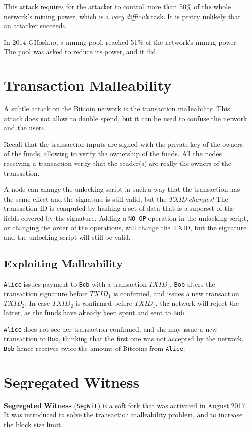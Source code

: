 This attack requires for the attacker to control more than 50\% of the whole network's mining power, which is a \textit{very difficult} task. It is pretty unlikely that an attacker succeeds.

In 2014 GHash.io, a mining pool, reached 51\% of the network's mining power. The pool was asked to reduce its power, and it did.

\section{Transaction Malleability}
A subtle attack on the Bitcoin network is the transaction malleability. This attack does not allow to double spend, but it can be used to confuse the network and the users.

Recall that the transaction inputs are signed with the private key of the owners of the funds, allowing to verify the ownership of the funds.
All the nodes receiving a transaction verify that the sender(s) are really the owners of the transaction.

A node can change the unlocking script in such a way that the transaction has the same effect and the signature is still valid, but the \textit{TXID changes!}
The transaction ID is computed by hashing a set of data that is a superset of the fields covered by the signature.
Adding a \texttt{NO\_OP} operation in the unlocking script, or changing the order of the operations, will change the TXID, but the signature and the unlocking script will still be valid.

\subsection{Exploiting Malleability}
\texttt{Alice} issues payment to \texttt{Bob} with a transaction $TXID_1$.
\texttt{Bob} alters the transaction signature before $TXID_1$ is confirmed, and issues a new transaction $TXID_2$.
In case $TXID_2$ is confirmed before $TXID_1$, the network will reject the latter, as the funds have already been spent and sent to \texttt{Bob}.

\texttt{Alice} does not see her transaction confirmed, and she may issue a new transaction to \texttt{Bob}, thinking that the first one was not accepted by the network.
\texttt{Bob} hence receives twice the amount of Bitcoins from \texttt{Alice}.

\section{Segregated Witness}
\textbf{Segregated Witness} (\texttt{SegWit}) is a soft fork that was activated in August 2017. It was introduced to solve the transaction malleability problem, and to increase the block size limit.

